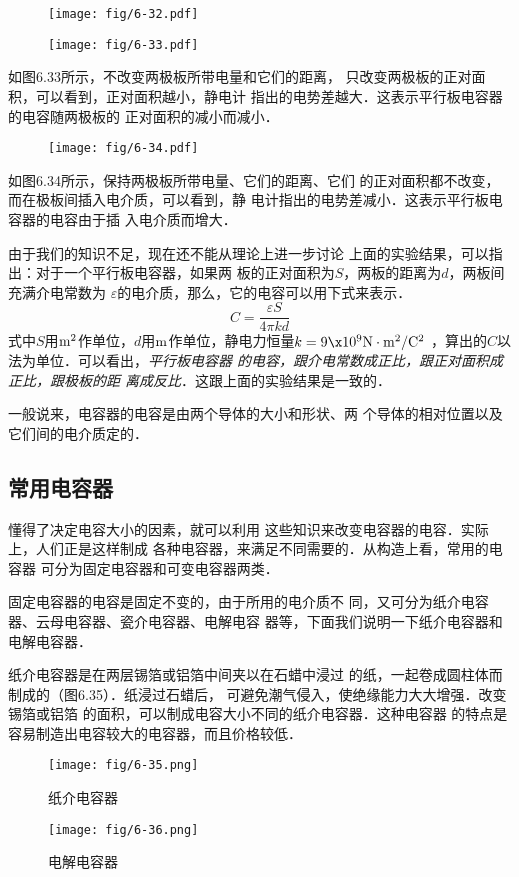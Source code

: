\begin{figure}[htp]
	\centering
	\begin{minipage}[t]{0.48\textwidth}
	\centering
	\texttt{[image: fig/6-32.pdf]}
	\caption{}
	\end{minipage}
	\begin{minipage}[t]{0.48\textwidth}
	\centering
	\texttt{[image: fig/6-33.pdf]}
	\caption{}
	\end{minipage}
	\end{figure}

	如图6.33所示，不改变两极板所带电量和它们的距离，
	只改变两极板的正对面积，可以看到，正对面积越小，静电计
	指出的电势差越大．这表示平行板电容器的电容随两极板的
	正对面积的减小而减小．
	\begin{figure}[htp]\centering
		\texttt{[image: fig/6-34.pdf]}
		\caption{}
		\end{figure}

	如图6.34所示，保持两极板所带电量、它们的距离、它们
	的正对面积都不改变，而在极板间插入电介质，可以看到，静
	电计指出的电势差减小．这表示平行板电容器的电容由于插
	入电介质而增大．

	由于我们的知识不足，现在还不能从理论上进一步讨论
	上面的实验结果，可以指出：对于一个平行板电容器，如果两
	板的正对面积为$S$，两板的距离为$d$，两板间充满介电常数为
	$\varepsilon$的电介质，那么，它的电容可以用下式来表示．
\[C=\frac{\varepsilon S}{4\pi kd} \]
式中$S$用${\rm m^2}$作单位，$d$用${\rm m}$作单位，静电力恒量$k=9\x 10^9{\rm N}\cdot {\rm m^2}/{\rm C^2}$
，算出的$C$以法为单位．可以看出，\textit{平行板电容器
的电容，跟介电常数成正比，跟正对面积成正比，跟极板的距
离成反比}．这跟上面的实验结果是一致的．

一般说来，电容器的电容是由两个导体的大小和形状、两
个导体的相对位置以及它们间的电介质定的．

\subsection{常用电容器}

懂得了决定电容大小的因素，就可以利用
这些知识来改变电容器的电容．实际上，人们正是这样制成
各种电容器，来满足不同需要的．从构造上看，常用的电容器
可分为固定电容器和可变电容器两类．

固定电容器的电容是固定不变的，由于所用的电介质不
同，又可分为纸介电容器、云母电容器、瓷介电容器、电解电容
器等，下面我们说明一下纸介电容器和电解电容器．

纸介电容器是在两层锡箔或铝箔中间夹以在石蜡中浸过
的纸，一起卷成圆柱体而制成的（图6.35）．纸浸过石蜡后，
可避免潮气侵入，使绝缘能力大大增强．改变锡箔或铝箔
的面积，可以制成电容大小不同的纸介电容器．这种电容器
的特点是容易制造出电容较大的电容器，而且价格较低．
\begin{figure}[htp]
	\centering
	\begin{minipage}[t]{0.48\textwidth}
	\centering
	\texttt{[image: fig/6-35.png]}
	\caption{纸介电容器}
	\end{minipage}
	\begin{minipage}[t]{0.48\textwidth}
	\centering
	\texttt{[image: fig/6-36.png]}
	\caption{电解电容器}
	\end{minipage}
	\end{figure}

